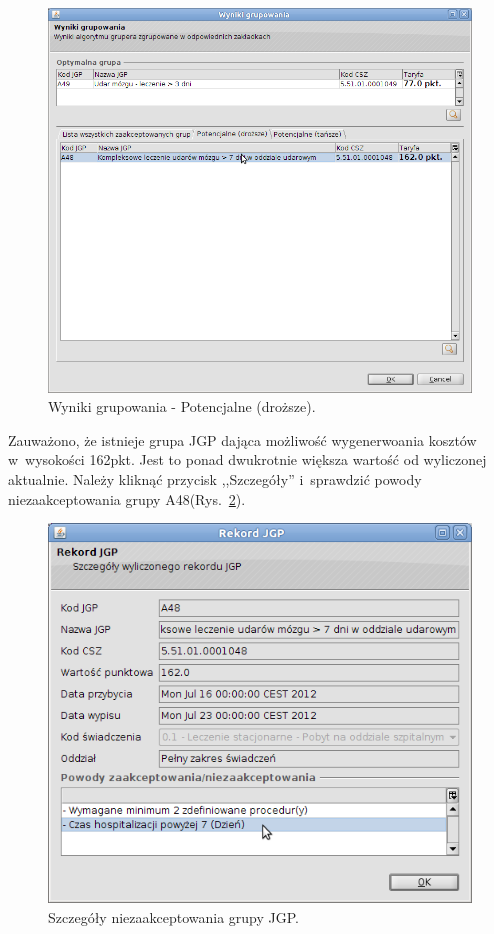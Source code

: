 \begin{figure}%
\centering
\includegraphics[scale=0.4]{images/gruper10}
\caption[Widok grupera]{Wyniki grupowania - Potencjalne (droższe).}
\label{img:gruper10}
\end{figure}

Zauważono, że istnieje grupa JGP dająca możliwość wygenerwoania kosztów w~wysokości 162pkt. Jest to ponad dwukrotnie większa wartość od wyliczonej aktualnie. Należy kliknąć przycisk ,,Szczegóły'' i~sprawdzić powody niezaakceptowania grupy A48(Rys.~\ref{img:gruper11}).

\begin{figure}%
\centering
\includegraphics[scale=0.4]{images/gruper11}
\caption[Widok grupera]{Szczegóły niezaakceptowania grupy JGP.}
\label{img:gruper11}
\end{figure}

